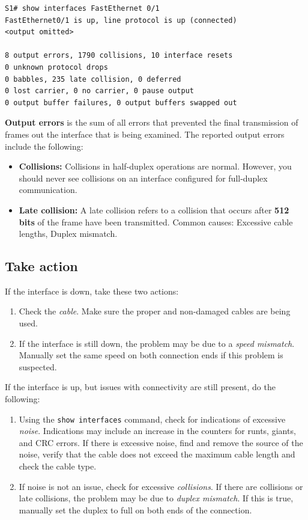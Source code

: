 \begin{verbatim}
S1# show interfaces FastEthernet 0/1
FastEthernet0/1 is up, line protocol is up (connected)
<output omitted>

8 output errors, 1790 collisions, 10 interface resets
0 unknown protocol drops
0 babbles, 235 late collision, 0 deferred
0 lost carrier, 0 no carrier, 0 pause output
0 output buffer failures, 0 output buffers swapped out
\end{verbatim}

\textbf{Output errors} is the sum of all errors that prevented the final transmission of frames out the interface that is being examined. The reported output errors include the following:

\begin{itemize}
\item \textbf{Collisions:} Collisions in half-duplex operations are normal. However, you should never see collisions on an interface configured for full-duplex communication.

\item \textbf{Late collision:} A late collision refers to a collision that occurs after \textbf{512 bits} of the frame have been transmitted. Common causes: Excessive cable lengths, Duplex mismatch.
\end{itemize}

\subsection{Take action}

If the interface is down, take these two actions:

\begin{enumerate}
\item Check the \emph{cable}. Make sure the proper and non-damaged cables are being used.

\item If the interface is still down, the problem may be due to a \emph{speed mismatch}. Manually set the same speed on both connection ends if this problem is suspected.
\end{enumerate}

If the interface is up, but issues with connectivity are still present, do the following:

\begin{enumerate}
\item Using the \verb|show interfaces| command, check for indications of excessive \emph{noise}. Indications may include an increase in the counters for runts, giants, and CRC errors. If there is excessive noise, find and remove the source of the noise, verify that the cable does not exceed the maximum cable length and check the cable type.

\item If noise is not an issue, check for excessive \emph{collisions}. If there are collisions or late collisions, the problem may be due to \emph{duplex mismatch}. If this is true, manually set the duplex to full on both ends of the connection.
\end{enumerate}